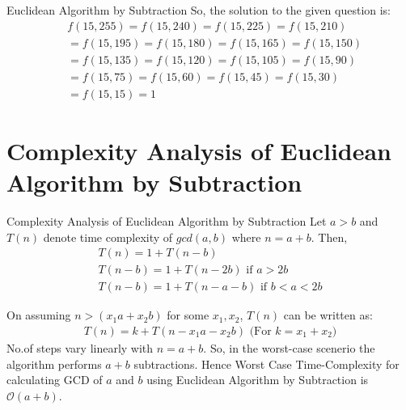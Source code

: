 \documentclass[8pt]{beamer}
\begin{document}
\begin{frame}[allowframebreaks]{Euclidean Algorithm by Subtraction}
So, the solution to the given question is:
\[
\begin{split}
&f(15,255) = f(15,240) = f(15,225) = f(15,210)\\
&= f(15,195) = f(15,180) = f(15,165) = f(15,150)\\
&= f(15,135) = f(15,120) = f(15,105) = f(15,90)\\
&= f(15,75) = f(15,60) = f(15,45) = f(15,30)\\
&= f(15,15) = 1
\end{split}\]

\end{frame}

\section{Complexity Analysis of Euclidean Algorithm by Subtraction}
\begin{frame}{Complexity Analysis of Euclidean Algorithm by Subtraction}
Let $a > b$ and $T(n)$ denote time complexity of $gcd(a,b)$ where $n = a+b$. Then,
\begin{align}
T(n) = 1 + T(n-b)\\
T(n-b) = 1 + T(n-2b) \text{ if $a > 2b$}\\
T(n-b) = 1 + T(n-a-b) \text{ if $b < a < 2b$}
\end{align}

On assuming $n > (x_{1}a + x_{2}b)$ for some $x_{1}, x_{2}$, $T(n)$ can be written as:
\begin{align}
T(n) = k + T(n - x_{1}a - x_{2}b) \text{ (For $k = x_{1} + x_{2}$)}
\end{align}
No.of steps vary linearly with $n=a+b$. So, in the worst-case scenerio the algorithm performs $a+b$ subtractions. Hence Worst Case Time-Complexity for calculating GCD of $a$ and  $b$ using Euclidean Algorithm by Subtraction is $\mathcal{O}(a + b)$.\\

\end{frame}
\end{document}
